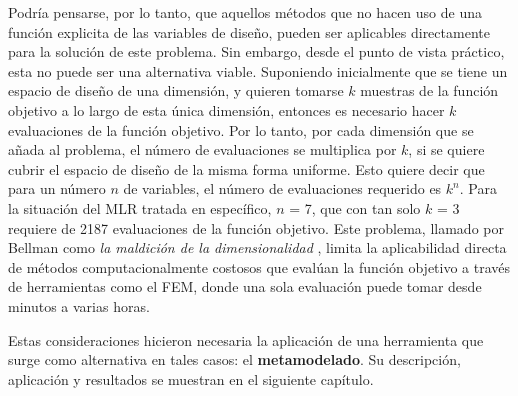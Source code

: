 Podría pensarse, por lo tanto, que aquellos métodos que no hacen uso de una función explicita de las variables de diseño, pueden ser aplicables directamente para la solución de este problema. Sin embargo, desde el punto de vista práctico, esta no puede ser una alternativa viable. Suponiendo inicialmente que se tiene un espacio de diseño de una dimensión, y quieren tomarse $k$ muestras de la función objetivo a lo largo de esta única dimensión, entonces es necesario hacer $k$ evaluaciones de la función objetivo. Por lo tanto, por cada dimensión que se añada al problema, el número de evaluaciones se multiplica por $k$, si se quiere cubrir el espacio de diseño de la misma forma uniforme. Esto quiere decir que para un número $n$ de variables, el número de evaluaciones requerido es $k^n$. Para la situación del MLR tratada en específico, $n$ = 7, que con tan solo $k$ = 3 requiere de 2187 evaluaciones de la función objetivo. Este problema, llamado por Bellman como \textit{la maldición de la dimensionalidad} \cite{bellman1957}, limita la aplicabilidad directa de métodos computacionalmente costosos que evalúan la función objetivo a través de herramientas como el FEM, donde una sola evaluación puede tomar desde minutos a varias horas.

Estas consideraciones hicieron necesaria la aplicación de una herramienta que surge como alternativa en tales casos: el \textbf{metamodelado}. Su descripción, aplicación y resultados se muestran en el siguiente capítulo.


